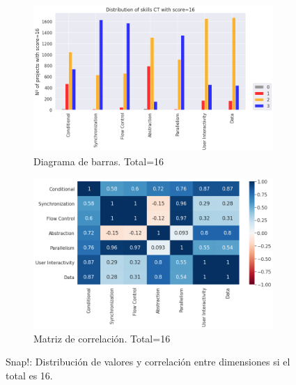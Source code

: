 \documentclass[a4paper, 12pt]{book}
\begin{document}
\begin{figure}
    \centering
    \begin{subfigure}[h]{.49\textwidth} 
        \includegraphics[width=\textwidth]{img/distribucion_16_Snap}
        \caption{Diagrama de barras. Total=16}
        \label{fig:total16_Snap}
    \end{subfigure}       
    \begin{subfigure}[h]{.49\textwidth} 
        \includegraphics[width=\textwidth]{img/corr_16_Snap}
        \caption{Matriz de correlación. Total=16}
        \label{fig:corr16_Snap}
    \end{subfigure}
    \caption{Snap!: Distribución de valores y correlación entre dimensiones si el total es 16.}
\end{figure}
\end{document}
